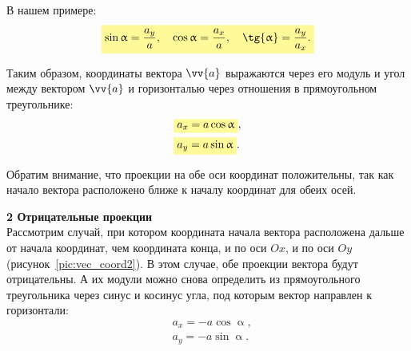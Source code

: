 В нашем примере:
\begin{align}
  \hly{\sin{\upalpha} = \dfrac{a_y}{a},\quad \cos{\upalpha} = \dfrac{a_x}{a},\quad \tg{\upalpha} = \dfrac{a_y}{a_x}.}
\end{align}

Таким образом, координаты вектора $\vv{a}$ выражаются через его модуль
и угол между вектором $\vv{a}$ и горизонталью через отношения в прямоугольном треугольнике:
\begin{align}
  &\hly{a_x = a\cos{\upalpha}},\\
  &\hly{a_y = a\sin{\upalpha}}.
\end{align}

Обратим внимание, что проекции на обе оси координат положительны, так как 
начало вектора расположено ближе к началу координат для обеих осей.

\clearpage

\textbf{2 Отрицательные проекции}\\
Рассмотрим случай, при котором координата начала вектора расположена
дальше от начала координат, чем координата конца,
и по оси $Ox$, и по оси $Oy$ (рисунок~\ref{pic:vec_coord2}).
В этом случае, обе проекции вектора будут отрицательны. А их модули можно
снова определить из прямоугольного треугольника через синус и косинус угла,
под которым вектор направлен к горизонтали:
\begin{align}
  &a_x = -a\cos{\upalpha},\\
  &a_y = -a\sin{\upalpha}.
\end{align}

